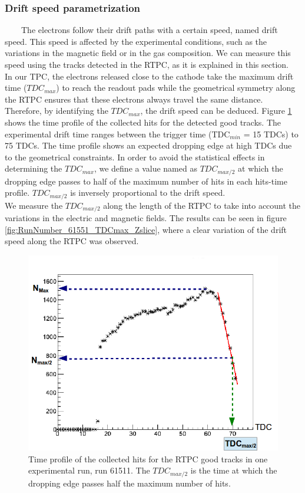 \subsubsection{Drift speed parametrization}
~~~~The electrons follow their drift paths with a certain speed, named drift speed. This speed is affected by the experimental conditions, such as the variations in the magnetic field or in the gas composition. We can measure this speed using the tracks detected in the RTPC, as it is explained in this section.\\


In our TPC, the electrons released close to the cathode take the maximum drift time ($TDC_{max}$) to reach the readout pads while the geometrical symmetry along the RTPC ensures that these electrons always travel the same distance. Therefore, by identifying the $TDC_{max}$, the drift speed can be deduced. Figure \ref{fig:TDC_profile} shows the time profile of the collected hits for the detected good tracks. The experimental drift time ranges between the trigger time (TDC$_{min}$ = 15 TDCs) to 75 TDCs. The time profile shows an expected dropping edge at high TDCs due to the geometrical constraints. In order to avoid the statistical effects in determining the  $TDC_{max}$, we define a value named as $TDC_{max/2}$ at which the dropping edge passes to half of the maximum number of hits in each hits-time profile. $TDC_{max/2}$ is inversely proportional to the drift speed.\\
 

We measure the $TDC_{max/2}$ along the length of the RTPC to take into account the variations in the electric and magnetic fields. The results can be seen in figure \ref{fig:RunNumber_61551_TDCmax_Zslice}, where a clear variation of the drift speed along the RTPC was observed. \\ 
\begin{figure}[tbp]
\centering
\vspace{-0.1in}
\includegraphics[scale=0.35]{fig_rtpc/TDC_profile.png}
\caption{Time profile of the collected hits for the RTPC good tracks in one experimental run, run 61511. The $TDC_{max/2}$ is the time at which the dropping edge passes half the maximum number of hits. }
\label{fig:TDC_profile}
\end{figure} 

